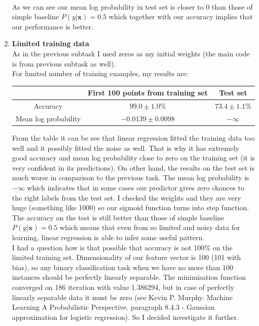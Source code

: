 \documentclass{article}
\newcommand{\vect}[1]{\boldsymbol{#1}} %
\begin{document}
\begin{enumerate}[label=(\alph*)]
						\\
						As we can see our mean log probability in  test set is closer to 0 than those of simple baseline $P(y | \vect{x})=0.5$ which together with our accuracy  implies that our performance is better.
						
					\item
						\textbf{Limited training data}\\
						As in the previous subtask I used zeros as my initial weights (the main code is from previous subtask as well).\\
						For limited number of training examples, my results are:
						\begin{center}
							\begin{tabular}{| c | c | c |}
								\hline
								\, & First 100 points from training set & Test set \\ 
								\hline
								Accuracy                  & $99.0 \pm 1.0 \%$ & $ 73.4 \pm 1.1 \%$ \\ 
								\hline
								Mean log probability &$-0.0139 \pm 0.0098$ & $-\infty$ \\
								\hline
							\end{tabular}
						\end{center}
						From the table it can be see that linear regression fitted the training data too well and it possibly fitted the noise as well.  That is why it has extremely good accuracy and mean log probability close to zero on the training set (it is very confident in its predictions). On other hand, the results on the test set is much worse in comparison to the previous task.  The mean log probability is $-\infty$ which indicates that in some cases our predictor gives zero chances to the right labels from the test set. I checked the weights and they are very huge (something like 1000) so our sigmoid function turns into step function. The accuracy on the test is still better than those of simple baseline $P(y | \vect{x})=0.5$ which means that even from so limited and noisy data for learning, linear regression is able to infer some useful pattern.
						\\
						I had a question how is that possible that accuracy is not 100\% on the limited training set. Dimensionality of our feature vector is 100 (101 with bias), so any binary classification task when we have no more than 100 instances should be perfectly linearly separable. The minimisation function converged on 186 iteration with value 1.386294, but in case of perfectly linearly separable data it must be zero (see  Kevin P. Murphy. Machine Learning  A Probabilistic Perspective. paragraph 8.4.3 - Gaussian approximation for logistic regression). So I decided investigate it further. 

\end{enumerate}
\end{document}

